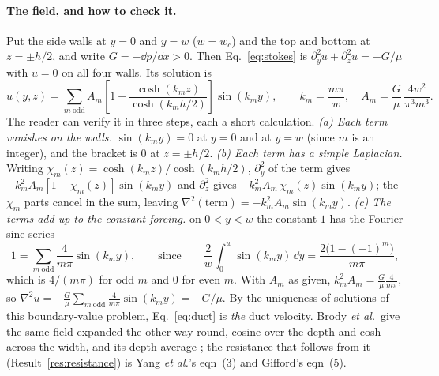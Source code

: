 \paragraph{The field, and how to check it.} Put the side walls at $y=0$ and $y=w$ ($w=w_c$) and
the top and bottom at $z=\pm h/2$, and write $G=-\dd p/\dd x>0$. Then Eq.~\eqref{eq:stokes}
is $\partial_y^2u+\partial_z^2u=-G/\mu$ with $u=0$ on all four walls. Its solution is
\begin{equation}
u(y,z) = \sum_{m\ \text{odd}} A_m\left[1 - \frac{\cosh(k_m z)}{\cosh(k_m h/2)}\right]\sin(k_m y),
\qquad k_m=\frac{m\pi}{w},\quad A_m=\frac{G}{\mu}\,\frac{4w^2}{\pi^3 m^3}.
\label{eq:duct}
\end{equation}
The reader can verify it in three steps, each a short calculation.
\emph{(a) Each term vanishes on the walls.} $\sin(k_m y)=0$ at $y=0$ and at $y=w$ (since $m$ is
an integer), and the bracket is $0$ at $z=\pm h/2$.
\emph{(b) Each term has a simple Laplacian.} Writing $\chi_m(z)=\cosh(k_mz)/\cosh(k_mh/2)$,
$\partial_y^2$ of the term gives $-k_m^2A_m[1-\chi_m(z)]\sin(k_my)$ and $\partial_z^2$ gives
$-k_m^2A_m\,\chi_m(z)\sin(k_my)$; the $\chi_m$ parts cancel in the sum, leaving
$\nabla^2(\text{term})=-k_m^2A_m\sin(k_my)$.
\emph{(c) The terms add up to the constant forcing.} on $0<y<w$ the constant $1$ has the Fourier
sine series
\begin{equation}
1=\sum_{m\ \text{odd}}\frac{4}{m\pi}\sin(k_my),\qquad\text{since}\qquad
\frac{2}{w}\int_0^w\sin(k_my)\,\dd y=\frac{2\big(1-(-1)^m\big)}{m\pi},
\end{equation}
which is $4/(m\pi)$ for odd $m$ and $0$ for even $m$. With $A_m$ as given, $k_m^2A_m=\frac{G}{\mu}\frac{4}{m\pi}$, so
$\nabla^2u=-\frac{G}{\mu}\sum_{m\ \text{odd}}\frac{4}{m\pi}\sin(k_my)=-G/\mu$. By the
uniqueness of solutions of this boundary-value problem, Eq.~\eqref{eq:duct} is \emph{the}
duct velocity. Brody \emph{et al.}\ give the same field expanded the other way round, cosine
over the depth and cosh across the width, and its depth average \cite[p.~3433, eqns~12, 15]{bbrody};
the resistance that follows from it (Result~\ref{res:resistance}) is Yang \emph{et al.}'s eqn~(3)
\cite[p.~875]{b6} and Gifford's eqn~(5).

